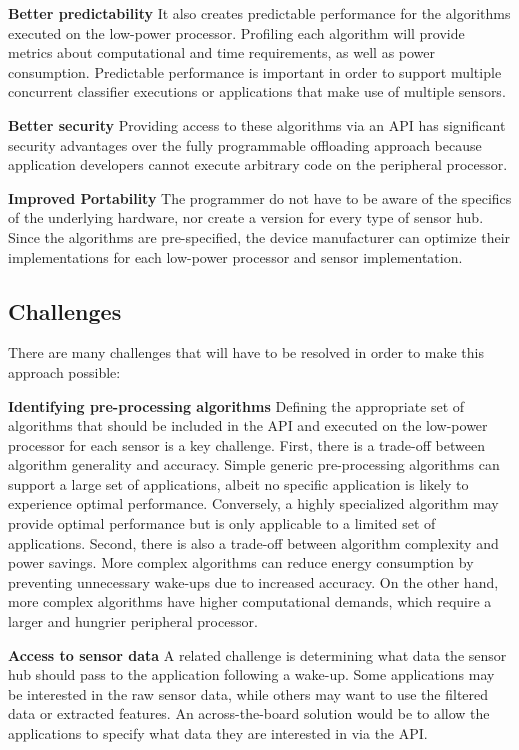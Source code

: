 {\bf Better predictability} It also
  creates predictable performance for the algorithms executed on the
  low-power processor. Profiling each algorithm will provide metrics
  about computational and time requirements, as well as power
  consumption.  Predictable performance is important in order to
  support multiple concurrent classifier executions or applications
  that make use of multiple sensors.


{\bf Better security} Providing access to these algorithms via
  an API has significant security advantages over the fully
  programmable offloading approach because application developers
  cannot execute arbitrary code on the peripheral processor. 


{\bf Improved Portability} The programmer do not have to be
  aware of the specifics of the underlying hardware, nor  create a version
  for every type of sensor hub. Since the algorithms are
  pre-specified, the device manufacturer can optimize their
  implementations for each low-power processor and sensor
  implementation.



\subsection{Challenges}

There are many challenges that will have to be resolved in order to
make this approach possible:

{\bf Identifying pre-processing algorithms} Defining the appropriate
set of algorithms that should be included in the API and executed on
the low-power processor for each sensor is a key challenge. First,
there is a trade-off between algorithm generality and accuracy.
Simple generic pre-processing algorithms can support a large set of
applications, albeit no specific application is likely to experience
optimal performance.  Conversely, a highly specialized algorithm may
provide optimal performance but is only applicable to a limited set of
applications.  Second, there is also a trade-off between algorithm
complexity and power savings.  More complex algorithms can reduce
energy consumption by preventing unnecessary wake-ups due to increased
accuracy. On the other hand, more complex algorithms have higher
computational demands, which require a larger and hungrier peripheral
processor.

{\bf Access to sensor data} A related challenge is determining what
data the sensor hub should pass to the application following a
wake-up. Some applications may be interested in the raw sensor data,
while others may want to use the filtered data or extracted features.
An across-the-board solution would be to allow the applications to
specify what data they are interested in via the API.


